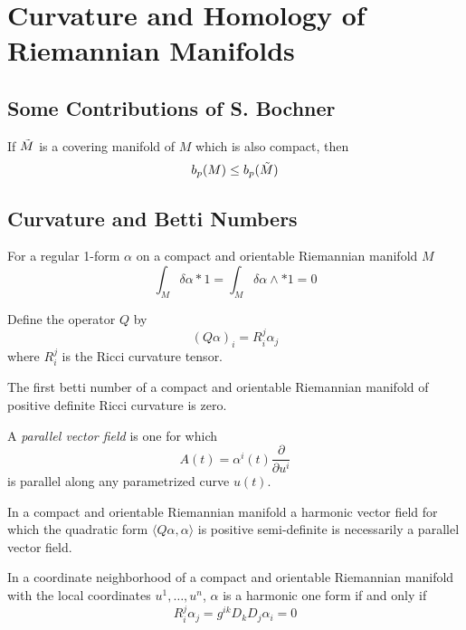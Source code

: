 \section{Curvature and Homology of Riemannian Manifolds}
\subsection{Some Contributions of S. Bochner}

\begin{prop}

If $ \Tilde{M}$ is a covering manifold of $M$ which is also compact, then
\[
	b_p(M) \leq b_p( \Tilde{M})
\]


\end{prop}

\subsection{Curvature and Betti Numbers}

\begin{lem}
For a regular 1-form $ \alpha$ on a compact and orientable Riemannian manifold $M$
\[
\int_M \delta \alpha * 1 = \int_M \delta \alpha \wedge * 1 = 0
\]

\end{lem}

\begin{defn}
Define the operator $Q$ by 
\[
	(Q \alpha)_i = R^j_i \alpha_j
\]
where $ R^j_i$ is the Ricci curvature tensor.
\end{defn}

\begin{thm}
	The first betti number of a compact and orientable Riemannian manifold of positive definite Ricci curvature is zero.
\end{thm}

\begin{defn}
	A \textit{parallel vector field} is one for which 
	\[
		A(t) = \alpha^i (t) \frac{ \partial }{\partial u^i } 
	\]
	is parallel along any parametrized curve $u(t)$.	
\end{defn}

\begin{thm}
	In a compact and orientable Riemannian manifold a harmonic vector field for which the quadratic form $ \langle Q \alpha, \alpha \rangle$ is positive semi-definite is necessarily a parallel vector field.
\end{thm}

\begin{thm}
In a coordinate neighborhood of a compact and orientable Riemannian manifold with the local coordinates $u^1, \ldots, u^n$, $ \alpha$ is a harmonic one form if and only if
\[
R^j_i \alpha_j = g^{ ik }D_k D_j \alpha_i = 0
\]

\end{thm}

